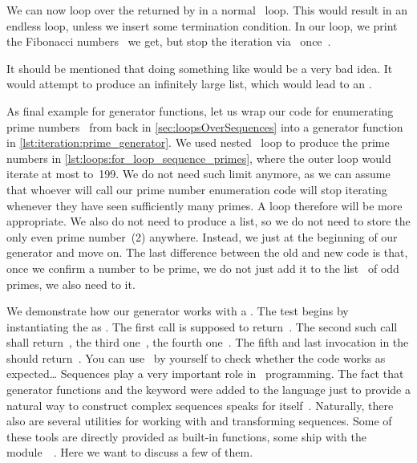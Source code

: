 We can now loop over the  returned by  in a normal ~loop.
This would result in an endless loop, unless we insert some termination condition.
In our loop, we print the Fibonacci numbers~ we get, but stop the iteration via~ once~.

It should be mentioned that doing something like  would be a very bad idea.
It would attempt to produce an infinitely large list, which would lead to an .

As final example for generator functions, let us wrap our code for enumerating prime numbers~\cite{W2024MAWWR:PN,CP2005PNACP,R1994PNACMFF} from back in \cref{sec:loopsOverSequences} into a generator function in \cref{lst:iteration:prime_generator}.
We used nested ~loop to produce the prime numbers in \cref{lst:loops:for_loop_sequence_primes}, where the outer loop would iterate at most to~199.
We do not need such limit anymore, as we can assume that whoever will call our prime number enumeration code will stop iterating whenever they have seen sufficiently many primes.
A  loop therefore will be more appropriate.
We also do not need to produce a list, so we do not need to store the only even prime number~(2) anywhere.
Instead, we just  at the beginning of our generator and move on.
The last difference between the old and new code is that, once we confirm a number to be prime, we do not just add it to the list~ of odd primes, we also need to  it.

We demonstrate how our generator works with a .
The test begins by instantiating the  as .
The first  call is supposed to return~.
The second such call shall return~, the third one~, the fourth one~.
The fifth and last  invocation in the  should return~.
You can use \pytest\ by yourself to check whether the code works as expected\dots%
\FloatBarrier%
\endhsection%
%
%
\label{sec:operationsOnIterators}%
%
%
%
%
Sequences play a very important role in \python\ programming.
The fact that generator functions and the  keyword were added to the language just to provide a natural way to construct complex sequences speaks for itself~\cite{PEP255}.
Naturally, there also are several utilities for working with and transforming sequences.
Some of these tools are directly provided as built-in functions, some ship with the module~~\cite{PSF:P3D:TPSL:IFCIFEL}.
Here we want to discuss a few of them.

